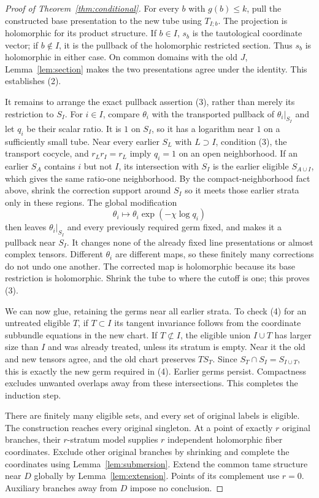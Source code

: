 \documentclass[11pt]{article}
\theoremstyle{definition}
\theoremstyle{remark}
\begin{document}
\begin{proof}[Proof of Theorem~\ref{thm:conditional}]
For every $b$ with $g(b)\leq k$, pull the constructed base presentation to the new tube using $T_{I;b}$. The projection is holomorphic for its product structure. If $b\in I$, $s_b$ is the tautological coordinate vector; if $b\notin I$, it is the pullback of the holomorphic restricted section. Thus $s_b$ is holomorphic in either case. On common domains with the old $J$, Lemma~\ref{lem:section} makes the two presentations agree under the identity. This establishes (2).

It remains to arrange the exact pullback assertion (3), rather than merely its restriction to $S_I$. For $i\in I$, compare $\theta_i$ with the transported pullback of $\theta_i|_{S_I}$ and let $q_i$ be their scalar ratio. It is $1$ on $S_I$, so it has a logarithm near $1$ on a sufficiently small tube. Near every earlier $S_L$ with $L\supset I$, condition (3), the transport cocycle, and $r_Lr_I=r_L$ imply $q_i=1$ on an open neighborhood. If an earlier $S_A$ contains $i$ but not $I$, its intersection with $S_I$ is the earlier eligible $S_{A\cup I}$, which gives the same ratio-one neighborhood. By the compact-neighborhood fact above, shrink the correction support around $S_I$ so it meets those earlier strata only in these regions. The global modification
\[
 \theta_i\longmapsto\theta_i\exp(-\chi\log q_i)
\]
then leaves $\theta_i|_{S_I}$ and every previously required germ fixed, and makes it a pullback near $S_I$. It changes none of the already fixed line presentations or almost complex tensors. Different $\theta_i$ are different maps, so these finitely many corrections do not undo one another. The corrected map is holomorphic because its base restriction is holomorphic. Shrink the tube to where the cutoff is one; this proves (3).

We can now glue, retaining the germs near all earlier strata. To check (4) for an untreated eligible $T$, if $T\subset I$ its tangent invariance follows from the coordinate subbundle equations in the new chart. If $T\not\subset I$, the eligible union $I\cup T$ has larger size than $I$ and was already treated, unless its stratum is empty. Near it the old and new tensors agree, and the old chart preserves $TS_T$. Since $S_T\cap S_I=S_{I\cup T}$, this is exactly the new germ required in (4). Earlier germs persist. Compactness excludes unwanted overlaps away from these intersections. This completes the induction step.

There are finitely many eligible sets, and every set of original labels is eligible. The construction reaches every original singleton. At a point of exactly $r$ original branches, their $r$-stratum model supplies $r$ independent holomorphic fiber coordinates. Exclude other original branches by shrinking and complete the coordinates using Lemma~\ref{lem:submersion}. Extend the common tame structure near $D$ globally by Lemma~\ref{lem:extension}. Points of its complement use $r=0$. Auxiliary branches away from $D$ impose no conclusion.
\end{proof}
\end{document}
